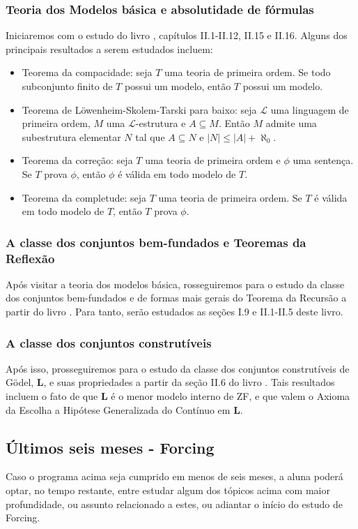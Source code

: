 \documentclass{article}
\begin{document}
    \subsubsection{Teoria dos Modelos básica e absolutidade de fórmulas}
    Iniciaremos com o estudo do livro \cite{kunen2009foundations}, capítulos II.1-II.12, II.15 e II.16. Alguns dos principais resultados a serem estudados incluem:
    \begin{itemize}
        \item Teorema da compacidade: seja $T$ uma teoria de primeira ordem. Se todo subconjunto finito de $T$ possui um modelo, então $T$ possui um modelo.
        \item Teorema de Löwenheim-Skolem-Tarski para baixo: seja $\mathcal L$ uma linguagem de primeira ordem, $M$ uma $\mathcal L$-estrutura e $A\subseteq M$. Então $M$ admite uma subestrutura elementar $N$ tal que $A\subseteq N$ e $|N|\leq |A|+\aleph_0$.
        \item Teorema da correção: seja $T$ uma teoria de primeira ordem e $\phi$ uma sentença. Se $T$ prova $\phi$, então $\phi$ é válida em todo modelo de $T$.
        \item Teorema da completude: seja $T$ uma teoria de primeira ordem. Se $T$ é válida em todo modelo de $T$, então $T$ prova $\phi$.
    \end{itemize}
    \subsubsection{A classe dos conjuntos bem-fundados e Teoremas da Reflexão}
    Após visitar a teoria dos modelos básica, rosseguiremos para o estudo da classe dos conjuntos bem-fundados e de formas mais gerais do Teorema da Recursão a partir do livro \cite{kunen2011set}. Para tanto, serão estudados as seções I.9 e II.1-II.5 deste livro.
    \subsubsection{A classe dos conjuntos construtíveis}
    Após isso, prosseguiremos para o estudo da classe dos conjuntos construtíveis de Gödel, $\mathbf{L}$, e suas propriedades a partir da seção II.6 do livro \cite{kunen2011set}. Tais resultados incluem o fato de que $\mathbf L$ é o menor modelo interno de ZF, e que valem o Axioma da Escolha a Hipótese Generalizada do Contínuo em $\mathbf L$.
    \subsection{Últimos seis meses - Forcing}
    Caso o programa acima seja cumprido em menos de seis meses, a aluna poderá optar, no tempo restante, entre estudar algum dos tópicos acima com maior profundidade, ou assunto relacionado a estes, ou adiantar o início do estudo de Forcing.
\end{document}
